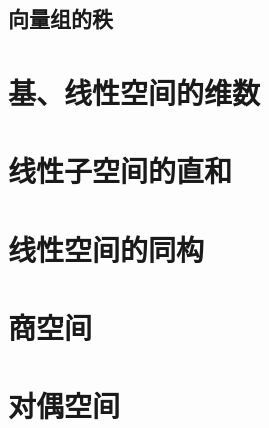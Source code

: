 \documentclass[12pt, a4paper, oneside, UTF8]{ctexbook}
\begin{document}
		\subsection{向量组的秩}
			
	\section{基、线性空间的维数}
	\section{线性子空间的直和}
	\section{线性空间的同构}
	\section{商空间}
	\section{对偶空间}
\ifx\allfiles\undefined
\end{document}
